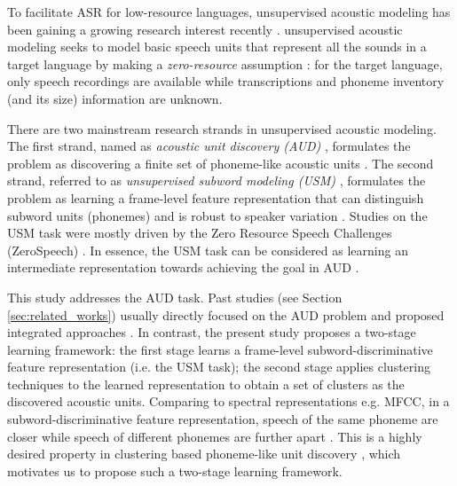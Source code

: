 \documentclass[a4paper]{article}
\begin{document}
To facilitate ASR for low-resource languages,  unsupervised acoustic modeling  has been gaining a growing research interest  recently \cite{lee2012a,I3EWang,chen2015parallel,ondel2017bayesian,Chen2020unsupervised}.  unsupervised acoustic modeling seeks to model basic speech units that represent  all the sounds in a target language by making a  \textit{zero-resource} assumption  \cite{versteegh2015zero}: for the target language, only speech recordings are available while transcriptions and phoneme inventory (and its size) information are unknown. 

There are two mainstream research strands in unsupervised acoustic modeling. The first strand, named as \textit{acoustic unit discovery (AUD)} \cite{ondel2016variational,lee2012a}, formulates the problem as discovering a finite set of phoneme-like acoustic units \cite{lee2012a,I3EWang,Ondel2019Bayesian}. 
The second strand, referred to as \textit{unsupervised subword modeling (USM)} \cite{versteegh2015zero,dunbar2017zero,Dunbar2019}, formulates the problem as learning a frame-level feature representation  that can distinguish subword units (phonemes)  and is robust to speaker variation \cite{chen2015parallel,oord2017neural,heck2017feature}. 
Studies on the USM task were mostly driven by the  Zero Resource Speech Challenges (ZeroSpeech)  \cite{versteegh2015zero,dunbar2017zero,Dunbar2019,Dunbar2020zero}. 
In essence, the USM task can be considered as learning an intermediate representation towards achieving the goal in AUD \cite{Feng2019combining}. 

This study addresses the AUD task. Past studies  (see Section \ref{sec:related_works})   usually directly focused  on the AUD problem  and proposed integrated approaches  \cite{lee2012a,Ondel2019Bayesian,baevski2020vqwav2vec}. In contrast, the present study proposes a two-stage learning framework: the first stage learns a frame-level subword-discriminative  feature representation  (i.e. the USM task); the second stage  applies clustering techniques to the  learned  representation to obtain a set of clusters as the discovered acoustic units. 
Comparing to spectral   representations e.g. MFCC,  in a subword-discriminative feature representation, speech of the same phoneme are closer while speech of different phonemes are further apart \cite{dunbar2017zero}. This is a highly desired property in     clustering based phoneme-like unit discovery \cite{I3EWang,Bhati2019unsupervised}, which motivates us to  propose such a two-stage learning framework.
\end{document}
